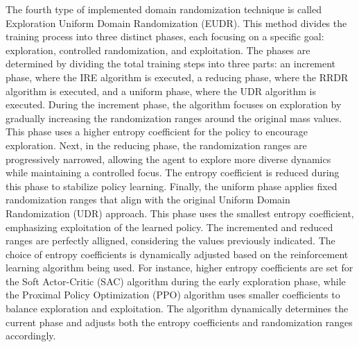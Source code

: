 \documentclass[11pt]{article}
\begin{document}
The fourth type of implemented domain randomization technique is called Exploration Uniform Domain Randomization (EUDR). This method divides the training process into three distinct phases, each focusing on a specific goal: exploration, controlled randomization, and exploitation. The phases are determined by dividing the total training steps into three parts: an increment phase, where the IRE algorithm is executed, a reducing phase, where the RRDR algorithm is executed, and a uniform phase, where the UDR algorithm is executed. During the increment phase, the algorithm focuses on exploration by gradually increasing the randomization ranges around the original mass values. This phase uses a higher entropy coefficient for the policy to encourage exploration. Next, in the reducing phase, the randomization ranges are progressively narrowed, allowing the agent to explore more diverse dynamics while maintaining a controlled focus. The entropy coefficient is reduced during this phase to stabilize policy learning. Finally, the uniform phase applies fixed randomization ranges that align with the original Uniform Domain Randomization (UDR) approach. This phase uses the smallest entropy coefficient, emphasizing exploitation of the learned policy. The incremented and reduced ranges are perfectly alligned, considering the values previously indicated. The choice of entropy coefficients is dynamically adjusted based on the reinforcement learning algorithm being used. For instance, higher entropy coefficients are set for the Soft Actor-Critic (SAC) algorithm during the early exploration phase, while the Proximal Policy Optimization (PPO) algorithm uses smaller coefficients to balance exploration and exploitation. The algorithm dynamically determines the current phase and adjusts both the entropy coefficients and randomization ranges accordingly.\\
\end{document}

